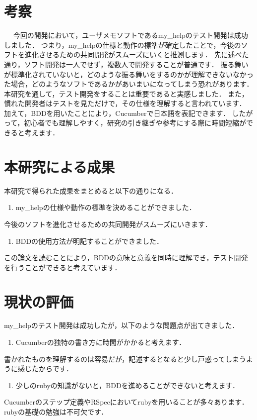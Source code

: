 \section{考察}
　
今回の開発において，ユーザメモソフトであるmy\_helpのテスト開発は成功しました．
つまり，my\_helpの仕様と動作の標準が確定したことで，今後のソフトを進化させるための共同開発がスムーズにいくと推測します．
先に述べた通り，ソフト開発は一人でせず，複数人で開発することが普通です．
振る舞いが標準化されていないと，どのような振る舞いをするのかが理解できないなかった場合，どのようなソフトであるかがあいまいになってしまう恐れがあります．
本研究を通して，テスト開発をすることは重要であると実感しました．
また，慣れた開発者はテストを見ただけで，その仕様を理解すると言われています．
加えて，BDDを用いたことにより，Cucumberで日本語を表記できます．
したがって，初心者でも理解しやすく，研究の引き継ぎや参考にする際に時間短縮ができると考えます．

\section{本研究による成果}
本研究で得られた成果をまとめると以下の通りになる．

\begin{enumerate}
\item my\_helpの仕様や動作の標準を決めることができました．
\end{enumerate}
今後のソフトを進化させるための共同開発がスムーズにいきます．

\begin{enumerate}
\item BDDの使用方法が明記することができました．
\end{enumerate}
この論文を読むことにより，BDDの意味と意義を同時に理解でき，テスト開発を行うことができると考えています．

\section{現状の評価}
my\_helpのテスト開発は成功したが，以下のような問題点が出てきました．

\begin{enumerate}
\item Cucumberの独特の書き方に時間がかかると考えます．
\end{enumerate}
書かれたものを理解するのは容易だが，記述するとなると少し戸惑ってしまうように感じたからです．

\begin{enumerate}
\item 少しのrubyの知識がないと，BDDを進めることができないと考えます．
\end{enumerate}
Cucumberのステップ定義やRSpecにおいてrubyを用いることが多々あります．
rubyの基礎の勉強は不可欠です．

